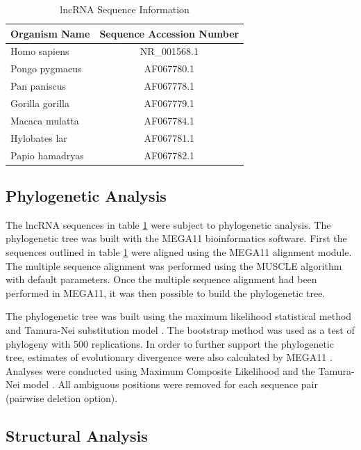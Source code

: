 \documentclass[conference, 11pt]{IEEEtran}
\begin{document}
\begin{table}[ht]
  \centering
  \caption{lncRNA Sequence Information}
  \label{tbl:accession}
  \begin{tabular}{lc}
    \toprule
    Organism Name & Sequence Accession Number \\
    \midrule
    Homo sapiens    & NR\_001568.1 \\
    Pongo pygmaeus  & AF067780.1 \\
    Pan paniscus    & AF067778.1 \\
    Gorilla gorilla & AF067779.1 \\
    Macaca mulatta  & AF067784.1 \\
    Hylobates lar   & AF067781.1 \\
    Papio hamadryas & AF067782.1 \\
    \bottomrule
  \end{tabular}
\end{table}

\subsection{Phylogenetic Analysis}\label{sec:phylo}

The lncRNA sequences in table \ref{tbl:accession} were subject to phylogenetic analysis.
The phylogenetic tree was built with the MEGA11 \cite{tamura2021mega11} bioinformatics software. 
First the sequences outlined in table \ref{tbl:accession} were aligned using the MEGA11 alignment module. 
The multiple sequence alignment was performed using the MUSCLE algorithm with default parameters. 
Once the multiple sequence alignment had been performed in MEGA11, it was then possible to build the phylogenetic tree. 

The phylogenetic tree was built using the maximum likelihood statistical method and Tamura-Nei substitution model \cite{tamura1993estimation, tamura2004prospects}. 
The bootstrap method was used as a test of phylogeny with 500 replications.
In order to further support the phylogenetic tree, estimates of evolutionary divergence were also calculated by MEGA11 \cite{tamura2021mega11}. 
Analyses were conducted using Maximum Composite Likelihood and the Tamura-Nei model \cite{tamura1993estimation, tamura2004prospects}. 
All ambiguous positions were removed for each sequence pair (pairwise deletion option). 

\subsection{Structural Analysis}\label{sec:structure}
\end{document}
